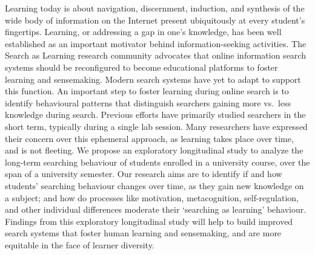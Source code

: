 \documentclass[letterpaper, nobind]{templates/ociamthesis}
\begin{document}
\begin{romanpages}
\begin{center}
\end{center}

\begin{spacing}{1.5}
  \indent
  Learning today is about navigation, discernment, induction, and synthesis of the wide body of information on the Internet present ubiquitously at every student's fingertips. Learning, or addressing a gap in one's knowledge, has been well established as an important motivator behind information-seeking activities. The Search as Learning research community advocates that online information search systems should be reconfigured to become educational platforms to foster learning and sensemaking. Modern search systems have yet to adapt to support this function. An important step to foster learning during online search is to identify behavioural patterns that distinguish searchers gaining more vs.~less knowledge during search. Previous efforts have primarily studied searchers in the short term, typically during a single lab session. Many researchers have expressed their concern over this ephemeral approach, as learning takes place over time, and is not fleeting. We propose an exploratory longitudinal study to analyze the long-term searching behaviour of students enrolled in a university course, over the span of a university semester. Our research aims are to identify if and how students' searching behaviour changes over time, as they gain new knowledge on a subject; and how do processes like motivation, metacognition, self-regulation, and other individual differences moderate their `searching as learning' behaviour. Findings from this exploratory longitudinal study will help to build improved search systems that foster human learning and sensemaking, and are more equitable in the face of learner diversity.
\end{spacing}




\dominitoc %

\flushbottom

\tableofcontents

\listoffigures
	\mtcaddchapter

\listoftables
  \mtcaddchapter

\end{romanpages}
\end{document}
